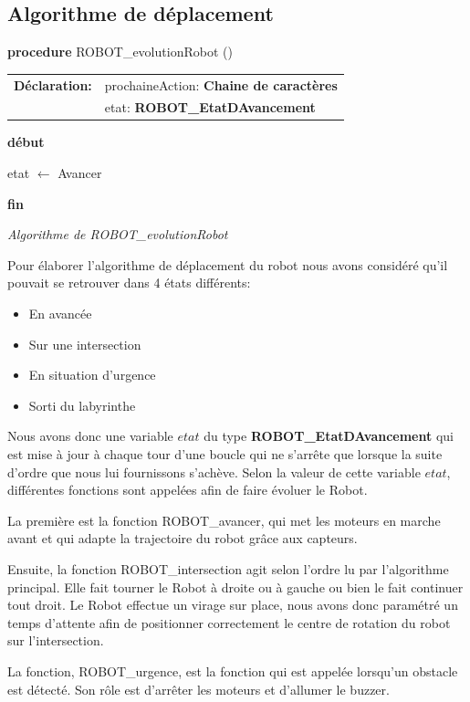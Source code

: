 \subsection{Algorithme de déplacement}

\noindent\textbf{procedure} ROBOT\_evolutionRobot ()

\begin{tabular}{ll}
    \textbf{Déclaration:} & prochaineAction: \textbf{Chaine de caractères}\\
     & etat: \textbf{ROBOT\_EtatDAvancement}\\
\end{tabular}

\noindent\textbf{début}

    \begin{algorithm}[H]
        etat $\leftarrow$ Avancer\\
    \end{algorithm}

    \noindent\textbf{fin}
\begin{center}
    \textit{Algorithme de ROBOT\_evolutionRobot}
\end{center}

Pour élaborer l'algorithme de déplacement du robot nous avons considéré qu'il pouvait se retrouver dans 4 états différents:
\begin{itemize}
    \item En avancée
    \item Sur une intersection
    \item En situation d'urgence
    \item Sorti du labyrinthe
\end{itemize} 

Nous avons donc une variable $etat$ du type \textbf{ROBOT\_EtatDAvancement} qui est mise à jour à chaque tour d'une boucle qui ne s'arrête que lorsque la suite d'ordre que nous lui fournissons s'achève.
Selon la valeur de cette variable $etat$, différentes fonctions sont appelées afin de faire évoluer le Robot.

La première est la fonction ROBOT\_avancer, qui met les moteurs en marche avant et qui adapte la trajectoire du robot grâce aux capteurs.

Ensuite, la fonction ROBOT\_intersection agit selon l'ordre lu par l'algorithme principal. Elle fait tourner le Robot à droite ou à gauche ou bien le fait continuer tout droit.
Le Robot effectue un virage sur place, nous avons donc paramétré un temps d'attente afin de positionner correctement le centre de rotation du robot sur l'intersection.

La fonction, ROBOT\_urgence, est la fonction qui est appelée lorsqu'un obstacle est détecté. Son rôle est d'arrêter les moteurs et d'allumer le buzzer.
